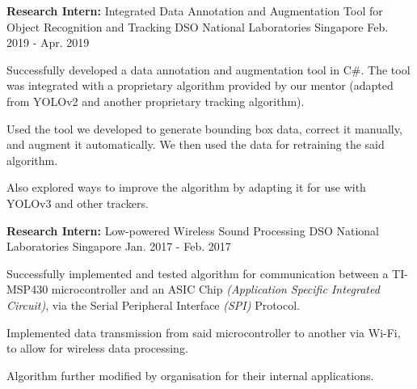 \begin{cventries}

\label{computerVisionProjectDSO}

\cventry
{
	\textbf{Research Intern:} Integrated Data Annotation and Augmentation Tool for Object Recognition and Tracking
} %
{DSO National Laboratories} %
{Singapore} %
{Feb. 2019 - Apr. 2019} %
{ %
	\begin{cvitems}
		\item { Successfully developed a data annotation and augmentation tool in C\#. The tool was integrated with a proprietary algorithm provided by our mentor (adapted from YOLOv2 and another proprietary tracking algorithm).}
		\item { Used the tool we developed to generate bounding box data, correct it manually, and augment it automatically. We then used the data for retraining the said algorithm.}
		\item { Also explored ways to improve the algorithm by adapting it for use with YOLOv3 and other trackers.}
	\end{cvitems}
}


\label{wirelessSoundProcessing}

\cventry
{\textbf{Research Intern:} Low-powered Wireless Sound Processing
} %
{DSO National Laboratories} %
{Singapore} %
{Jan. 2017 - Feb. 2017} %
{ %
\begin{cvitems}
	\item { Successfully implemented and tested algorithm for communication between a TI-MSP430 microcontroller and an ASIC Chip \textit{(Application Specific Integrated Circuit)}, via the Serial Peripheral Interface \textit{(SPI)} Protocol. }
	\item { Implemented data transmission from said microcontroller to another via Wi-Fi, to allow for wireless data processing. }
	\item { Algorithm further modified by organisation for their internal applications. }
\end{cvitems}
}


\label{lightDirectionFinderProject}


\end{cventries}
